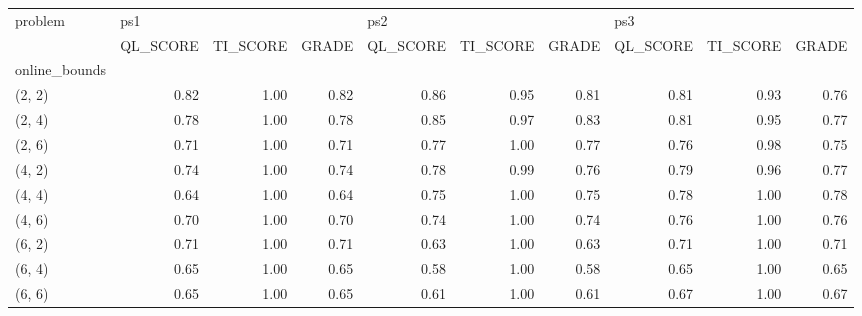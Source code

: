 \begin{tabular}{lrrrrrrrrr}
\toprule
problem & \multicolumn{3}{l}{ps1} & \multicolumn{3}{l}{ps2} & \multicolumn{3}{l}{ps3} \\
{} & QL\_SCORE & TI\_SCORE & GRADE & QL\_SCORE & TI\_SCORE & GRADE & QL\_SCORE & TI\_SCORE & GRADE \\
online\_bounds &          &          &       &          &          &       &          &          &       \\
\midrule
(2, 2)        &     0.82 &     1.00 &  0.82 &     0.86 &     0.95 &  0.81 &     0.81 &     0.93 &  0.76 \\
(2, 4)        &     0.78 &     1.00 &  0.78 &     0.85 &     0.97 &  0.83 &     0.81 &     0.95 &  0.77 \\
(2, 6)        &     0.71 &     1.00 &  0.71 &     0.77 &     1.00 &  0.77 &     0.76 &     0.98 &  0.75 \\
(4, 2)        &     0.74 &     1.00 &  0.74 &     0.78 &     0.99 &  0.76 &     0.79 &     0.96 &  0.77 \\
(4, 4)        &     0.64 &     1.00 &  0.64 &     0.75 &     1.00 &  0.75 &     0.78 &     1.00 &  0.78 \\
(4, 6)        &     0.70 &     1.00 &  0.70 &     0.74 &     1.00 &  0.74 &     0.76 &     1.00 &  0.76 \\
(6, 2)        &     0.71 &     1.00 &  0.71 &     0.63 &     1.00 &  0.63 &     0.71 &     1.00 &  0.71 \\
(6, 4)        &     0.65 &     1.00 &  0.65 &     0.58 &     1.00 &  0.58 &     0.65 &     1.00 &  0.65 \\
(6, 6)        &     0.65 &     1.00 &  0.65 &     0.61 &     1.00 &  0.61 &     0.67 &     1.00 &  0.67 \\
\bottomrule
\end{tabular}
